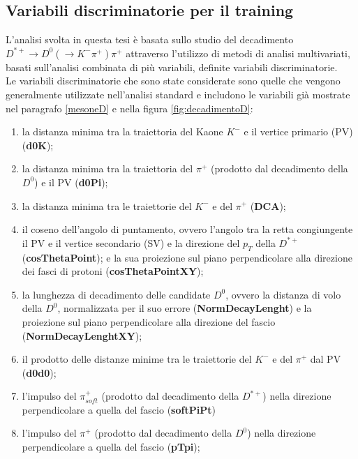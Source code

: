 \subsection{Variabili discriminatorie per il training}
L'analisi svolta in questa tesi \`e basata sullo studio del decadimento $D^{*+} \rightarrow D^0( \rightarrow K^- \pi^+)  \pi^+ $ attraverso l'utilizzo di metodi di analisi multivariati, basati sull'analisi combinata di pi\`u variabili, definite variabili discriminatorie. %
\\Le variabili discriminatorie che sono state considerate sono quelle che vengono generalmente utilizzate nell'analisi standard\cite{dati_ALICE} e includono le variabili gi\`a mostrate nel paragrafo \ref{mesoneD} e nella figura \ref{fig:decadimentoD}:       \begin{enumerate}
 \item la distanza minima tra la traiettoria del Kaone $K^-$  e il vertice primario (PV) (\textbf{d0K});
                \item la distanza minima tra la traiettoria del $\pi^+$ (prodotto dal decadimento della $D^0$) e il PV (\textbf{d0Pi});
            \item la distanza minima tra le traiettorie del $K^-$ e del $\pi^+$ (\textbf{DCA});
            \item il coseno dell'angolo di puntamento, ovvero l'angolo tra la retta congiungente il PV e il vertice secondario (SV) e la direzione del $p_T$ della $D^{*+}$ (\textbf{cosThetaPoint});
            e la sua proiezione sul piano perpendicolare alla direzione dei fasci di protoni (\textbf{cosThetaPointXY});
            \item la lunghezza di decadimento delle candidate $D^0$, ovvero la distanza di volo della $D^0$, normalizzata per il suo errore (\textbf{NormDecayLenght}) e la  proiezione sul piano perpendicolare alla direzione del fascio (\textbf{NormDecayLenghtXY});
            \item il prodotto delle distanze minime tra le traiettorie del  $K^-$ e del $\pi^+$ dal PV (\textbf{d0d0});
            \item l'impulso del $\pi^+_{soft}$ (prodotto dal decadimento della $D^{*+}$) nella direzione perpendicolare a quella del fascio (\textbf{softPiPt})
            \item l'impulso del $\pi^+$ (prodotto dal decadimento della $D^0$) nella direzione perpendicolare a quella del fascio (\textbf{pTpi});

\end{enumerate}
